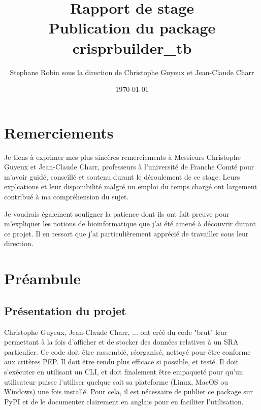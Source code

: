 \documentclass[twoside,a4paper,11pt,frenchb,openany]{report}
\title{\textbf{Rapport de stage \\ Publication du package crisprbuilder\_tb}}
\author{Stephane Robin sous la direction de Christophe Guyeux et Jean-Claude Charr}
\date{\today}
\begin{document}
	
\maketitle
	

	
	
\chapter*{Remerciements}
	
Je tiens à exprimer mes plus sincères remerciements à Messieurs Christophe Guyeux et Jean-Claude Charr, professeurs à l'université de Franche Comté pour m'avoir guidé, conseillé et soutenu durant le déroulement de ce stage. Leurs explcations et leur disponibilité malgré un emploi du temps chargé ont largement contribué à ma compréhension du sujet.

Je voudrais également souligner la patience dont ils ont fait preuve pour m'expliquer les notions de bioinformatique que j'ai été amené à découvrir durant ce projet. Il en ressort que j'ai particulièrement apprécié de travailler sous leur direction.



\tableofcontents



\chapter*{Préambule}



\section{Présentation du projet}

Christophe Guyeux, Jean-Claude Charr, ... ont créé du code "brut" leur permettant à la fois d'afficher et de stocker des données relatives à un SRA particulier. Ce code doit être rassemblé, réorganisé, nettoyé pour être conforme aux critères PEP. Il doit être rendu plus efficace si possible, et testé. Il doit s'exécuter en utilisant un CLI, et doit finalement être empaqueté pour qu'un utilisateur puisse l'utiliser quelque soit sa plateforme (Linux, MacOS ou Windows) une fois installé. Pour cela, il est nécessaire de publier ce package sur PyPI et de le documenter clairement en anglais pour en faciliter l'utilisation.
\end{document}
